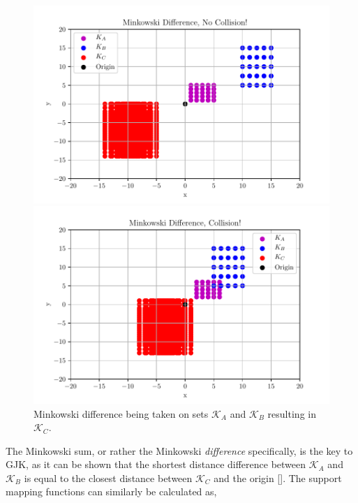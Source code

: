 \begin{figure}[h]
	
	\begin{minipage}[t]{1\textwidth}
		\centering
		\includegraphics[scale=0.45]{import/No_Collision.pdf}
	\end{minipage}

	\begin{minipage}[t]{1\textwidth}
		\centering
		\includegraphics[scale=0.45]{import/Collision.pdf}
	\end{minipage}
	\caption{Minkowski difference being taken on sets $\mathcal{K}_A$ and $\mathcal{K}_B$ resulting in $\mathcal{K}_C$.}
	\label{fig:minkow}
\end{figure}
The Minkowski sum, or rather the Minkowski \textit{difference} specifically, is the key to \gls{GJK}, as it can be shown that the shortest distance difference between $\mathcal{K}_A$ and $\mathcal{K}_B$ is equal to the closest distance between $\mathcal{K}_C$ and the origin [\citeauthor{Lindemann2009}]. The support mapping functions can similarly be calculated as,
